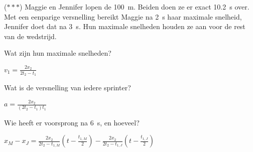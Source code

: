 \documentclass{ximera}
\begin{document}
\begin{exercise}
    ($\ast\ast\ast$) Maggie en Jennifer lopen de \SI{100}{m}. Beiden doen ze er exact \SI{10.2}{\second} over. 
    Met een eenparige versnelling bereikt Maggie na \SI{2}{\second} haar maximale snelheid, Jennifer doet dat na \SI{3}{s}. 
    Hun maximale snelheden houden ze aan voor de rest van de wedstrijd.
    \begin{question} Wat zijn hun maximale snelheden?                 
    \begin{oplossing} 
        $v_1=\frac{2x_2}{2t_2-t_1}$ 
    \end{oplossing} 
    \end{question}
    \begin{question} Wat is de versnelling van iedere sprinter?
    \begin{oplossing} 
        $a=\frac{2x_2}{(2t_2-t_1)t_1}$  
    \end{oplossing} 
    \end{question}
    \begin{question} Wie heeft er voorsprong na \SI{6}{s}, en hoeveel? 
    \begin{oplossing} $x_M-x_J=\frac{2x_2}{2t_2-t_{1,M}}(t-\frac{t_{1,M}}{2})-\frac{2x_2}{2t_2-t_{1,J}}(t-\frac{t_{1,J}}{2})$ 

                
                
                
    \end{oplossing} 
    \end{question}
\end{exercise}
\end{document}
